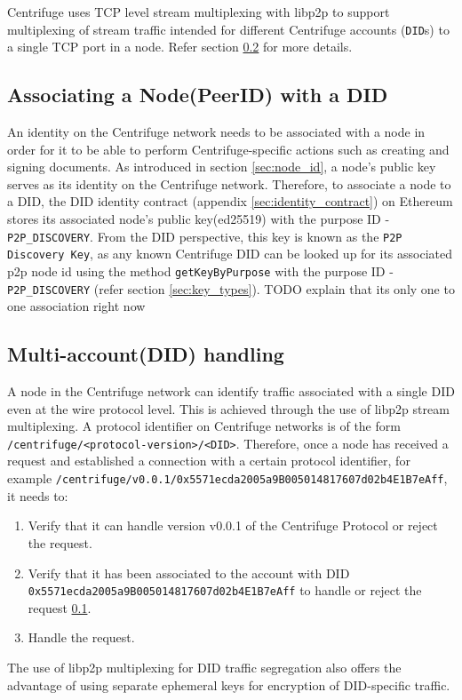 Centrifuge uses TCP level stream multiplexing with libp2p to support multiplexing of stream traffic intended for different Centrifuge accounts (\texttt{DID}s) to a single TCP port in a node. Refer section \ref{sec:p2p_multi_account} for more details.

\subsection{Associating a Node(PeerID) with a DID}\label{did-node}

An identity on the Centrifuge network needs to be associated with a node in order for it to be able to perform Centrifuge-specific actions such as creating and signing documents. As introduced in section \ref{sec:node_id}, a node's public key serves as its identity on the Centrifuge network. Therefore, to associate a node to a DID, the DID identity contract (appendix \ref{sec:identity_contract}) on Ethereum stores its associated node's public key(ed25519) with the purpose ID - \texttt{P2P\_DISCOVERY}. From the DID perspective, this key is known as the \texttt{P2P Discovery Key}, as any known Centrifuge DID can be looked up for its associated p2p node id using the method \texttt{getKeyByPurpose} with the purpose ID - \texttt{P2P\_DISCOVERY} (refer section \ref{sec:key_types}). TODO explain that its only one to one association right now


\subsection{Multi-account(DID) handling} \label{sec:p2p_multi_account}

A node in the Centrifuge network can identify traffic associated with a single DID even at the wire protocol level. This is achieved through the use of libp2p stream multiplexing. A protocol identifier on Centrifuge networks is of the form \texttt{/centrifuge/<protocol-version>/<DID>}. Therefore, once a node has received a request and established a connection with a certain protocol identifier, for example \texttt{/centrifuge/v0.0.1/0x5571ecda2005a9B005014817607d02b4E1B7eAff}, it needs to:
\begin{enumerate}
  \item Verify that it can handle version v0.0.1 of the Centrifuge Protocol or reject the request.
  \item Verify that it has been associated to the account with DID \texttt{0x5571ecda2005a9B005014817607d02b4E1B7eAff} to handle or reject the request \ref{did-node}.
  \item Handle the request.
\end{enumerate}
The use of libp2p multiplexing for DID traffic segregation also offers the advantage of using separate ephemeral keys for encryption of DID-specific traffic.

